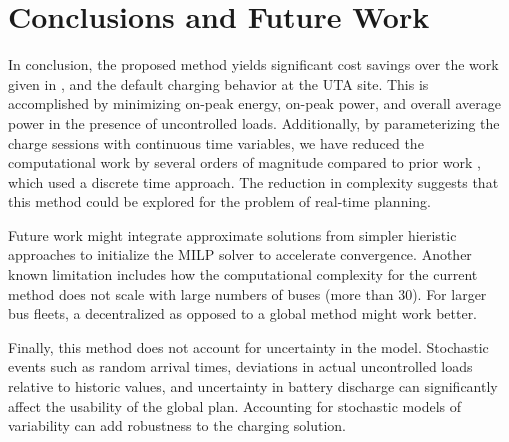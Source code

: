 \section{Conclusions and Future Work }
In conclusion, the proposed method yields significant cost savings over the work given in \cite{He_2019_Fast}, and the default charging behavior at the UTA site. This is accomplished by minimizing on-peak energy, on-peak power, and overall average power in the presence of uncontrolled loads. Additionally, by parameterizing the charge sessions with continuous time variables, we have reduced the computational work by several orders of magnitude compared to prior work \cite{mortensen_comprehensive_2021}, which used a discrete time approach. The reduction in complexity suggests that this method could be explored for the problem of real-time planning. 
\par Future work might integrate approximate solutions from simpler hieristic approaches to initialize the MILP solver to accelerate convergence. Another known limitation includes how the computational complexity for the current method does not scale with large numbers of buses (more than 30). For larger bus fleets, a decentralized as opposed to a global method might work better. 
\par Finally, this method does not account for uncertainty in the model.  Stochastic events such as random arrival times, deviations in actual uncontrolled loads relative to historic values, and uncertainty in battery discharge can significantly affect the usability of the global plan. Accounting for stochastic models of variability can add robustness to the charging solution.  

